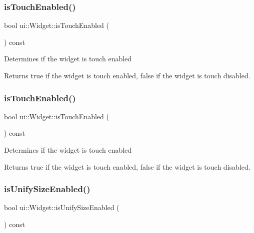 \subsubsection{\texorpdfstring{is\+Touch\+Enabled()}{isTouchEnabled()}\hspace{0.1cm}{\footnotesize\ttfamily [1/2]}}
{\footnotesize\ttfamily bool ui\+::\+Widget\+::is\+Touch\+Enabled (\begin{DoxyParamCaption}{ }\end{DoxyParamCaption}) const}

Determines if the widget is touch enabled

\begin{DoxyReturn}{Returns}
true if the widget is touch enabled, false if the widget is touch disabled. 
\end{DoxyReturn}
\mbox{\label{classui_1_1Widget_aad4e2d18440585570baae60a85d5f97a}} 
\subsubsection{\texorpdfstring{is\+Touch\+Enabled()}{isTouchEnabled()}\hspace{0.1cm}{\footnotesize\ttfamily [2/2]}}
{\footnotesize\ttfamily bool ui\+::\+Widget\+::is\+Touch\+Enabled (\begin{DoxyParamCaption}{ }\end{DoxyParamCaption}) const}

Determines if the widget is touch enabled

\begin{DoxyReturn}{Returns}
true if the widget is touch enabled, false if the widget is touch disabled. 
\end{DoxyReturn}
\mbox{\label{classui_1_1Widget_ad4e0c8796f018f4a1a97e9ca860d6f43}} 
\subsubsection{\texorpdfstring{is\+Unify\+Size\+Enabled()}{isUnifySizeEnabled()}\hspace{0.1cm}{\footnotesize\ttfamily [1/2]}}
{\footnotesize\ttfamily bool ui\+::\+Widget\+::is\+Unify\+Size\+Enabled (\begin{DoxyParamCaption}{ }\end{DoxyParamCaption}) const}

